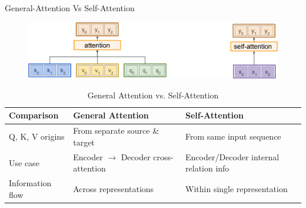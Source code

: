 \begin{frame}[allowframebreaks]{General-Attention Vs Self-Attention}
    \begin{figure}
        \flushleft
        \includegraphics[width=\linewidth,height=\textheight,keepaspectratio]{images/transformers/slide_48_1_img.png}
    \end{figure}
    \vspace{0.5cm}
    \begin{table}[ht]
        \centering
        \begin{tabular}{|l|p{3.5cm}|p{3.5cm}|}
            \hline
            \textbf{Comparison} & \textbf{General Attention} & \textbf{Self-Attention} \\
            \hline
            Q, K, V origins & From separate source \& target & From same input sequence \\
            \hline
            Use case & Encoder $\rightarrow$ Decoder cross-attention & Encoder/Decoder internal relation info \\
            \hline
            Information flow & Across representations & Within single representation \\
            \hline
        \end{tabular}
        \caption{General Attention vs. Self-Attention}
    \end{table}
\end{frame}